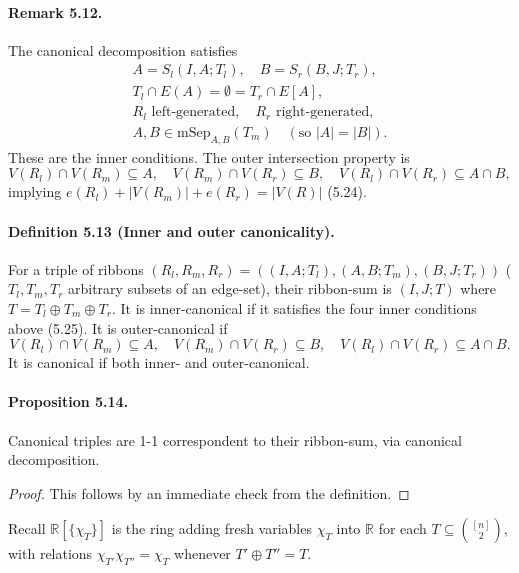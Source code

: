 \documentclass[10pt,a4paper]{article}
\begin{document}
\paragraph{Remark 5.12.} The canonical decomposition satisfies
\begin{gather*}A=S_l(I,A;T_l),\quad B=S_r(B,J;T_r),\\T_l\cap E(A)=\emptyset=T_r\cap E[A],\\R_l\text{ left-generated},\quad R_r\text{ right-generated},\\A,B\in\mathrm{mSep}_{A,B}(T_m)\quad(\text{so }|A|=|B|).
\end{gather*}
These are the inner conditions. The outer intersection property is
\[V(R_l)\cap V(R_m)\subseteq A,\quad V(R_m)\cap V(R_r)\subseteq B,\quad V(R_l)\cap V(R_r)\subseteq A\cap B,\]
implying $e(R_l)+|V(R_m)|+e(R_r)=|V(R)|$ (5.24).
\paragraph{Definition 5.13 (Inner and outer canonicality).} For a triple of ribbons $(R_l,R_m,R_r)=((I,A;T_l),(A,B;T_m),(B,J;T_r))$ ($T_l,T_m,T_r$ arbitrary subsets of an edge-set), their ribbon-sum is $(I,J;T)$ where $T=T_l\oplus T_m\oplus T_r$. It is inner-canonical if it satisfies the four inner conditions above (5.25). It is outer-canonical if
\[V(R_l)\cap V(R_m)\subseteq A,\quad V(R_m)\cap V(R_r)\subseteq B,\quad V(R_l)\cap V(R_r)\subseteq A\cap B.\tag{5.26}\]
It is canonical if both inner- and outer-canonical.
\paragraph{Proposition 5.14.} Canonical triples are 1-1 correspondent to their ribbon-sum, via canonical decomposition.
\begin{proof}This follows by an immediate check from the definition.\end{proof}
Recall $\mathbb R[\{\chi_T\}]$ is the ring adding fresh variables $\chi_T$ into $\mathbb R$ for each $T\subseteq\binom{[n]}2$, with relations $\chi_{T'}\chi_{T''}=\chi_T$ whenever $T'\oplus T''=T$.
\end{document}
